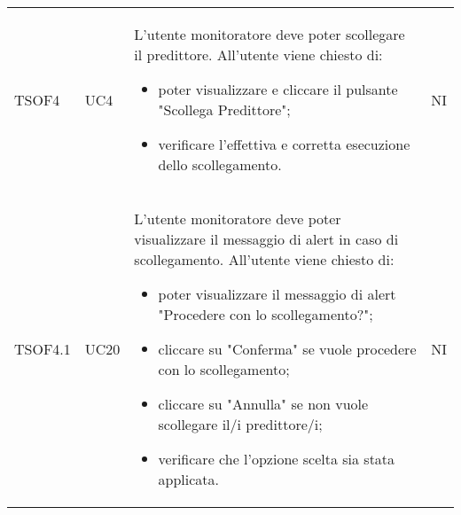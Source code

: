 \begin{longtable}{C{2.5cm} C{2.5cm} L{8cm} C{2cm}}
TSOF4 &
UC4 &
L'utente monitoratore deve poter scollegare il predittore. All'utente viene chiesto di:
\begin{itemize}
	\item poter visualizzare e cliccare il pulsante "Scollega Predittore";
	\item verificare l'effettiva e corretta esecuzione dello scollegamento.
\end{itemize}&
NI \\


TSOF4.1 &
UC20 &
L'utente monitoratore deve poter visualizzare il messaggio di alert in caso di scollegamento. All'utente viene chiesto di:
\begin{itemize}
	\item poter visualizzare il messaggio di alert "Procedere con lo scollegamento?";
	\item cliccare su "Conferma" se vuole procedere con lo scollegamento;
	\item cliccare su "Annulla" se non vuole scollegare il/i predittore/i;
	\item verificare che l’opzione scelta sia stata applicata.
\end{itemize}&
NI \\



\end{longtable}
